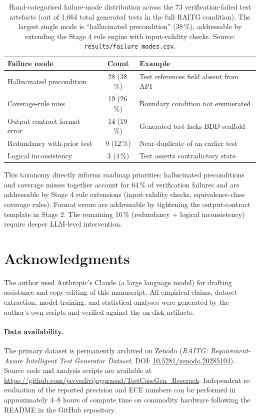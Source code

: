 \documentclass[review,12pt]{elsarticle}
\begin{document}
\begin{table}[!ht]
\centering
\caption{Hand-categorised failure-mode distribution across the 73
verification-failed test artefacts (out of 1{,}664 total generated
tests in the full-RAITG condition). The largest single mode is
``hallucinated precondition'' (38\,\%), addressable by extending
the Stage 4 rule engine with input-validity checks. Source:
\texttt{results/failure\_modes.csv}.}
\label{tab:failure_modes}
\small
\begin{tabular}{lcl}
\toprule
Failure mode                       & Count & Example \\
\midrule
Hallucinated precondition          & 28 (38\,\%) & Test references field absent from API \\
Coverage-rule miss                 & 19 (26\,\%) & Boundary condition not enumerated \\
Output-contract format error       & 14 (19\,\%) & Generated test lacks BDD scaffold \\
Redundancy with prior test         & 9 (12\,\%)  & Near-duplicate of an earlier test  \\
Logical inconsistency              & 3 (4\,\%)   & Test asserts contradictory state \\
\bottomrule
\end{tabular}
\end{table}

This taxonomy directly informs roadmap priorities: hallucinated
preconditions and coverage misses together account for 64\,\% of
verification failures and are addressable by Stage 4 rule extensions
(input-validity checks, equivalence-class coverage rules). Format
errors are addressable by tightening the output-contract template in
Stage 2. The remaining 16\,\% (redundancy + logical inconsistency)
require deeper LLM-level intervention.

\section*{Acknowledgments}
The author used Anthropic's Claude (a large language model) for drafting assistance and copy-editing of this manuscript. All empirical claims, dataset extraction, model training, and statistical analyses were generated by the author's own scripts and verified against the on-disk artifacts.

\paragraph*{Data availability.} The primary dataset is permanently archived on Zenodo (\textit{RAITG: Requirement-Aware Intelligent Test Generator Dataset}, DOI: \href{https://doi.org/10.5281/zenodo.20285104}{10.5281/zenodo.20285104}). Source code and analysis scripts are available at \url{https://github.com/javvadivijayprasad/TestCaseGen_Reserach}. Independent re-evaluation of the reported precision and ECE numbers can be performed in approximately 4--8 hours of compute time on commodity hardware following the README in the GitHub repository.
\end{document}
